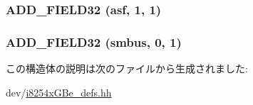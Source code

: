 \label{structiGbReg_1_1Regs_1_1MANC_a4a8a02182e3eb0c5408be4e56e873e90}
\hypertarget{structiGbReg_1_1Regs_1_1MANC_aa2498565dcb9beee017c0ced1f44f243}{
\subsubsection[{ADD\_\-FIELD32}]{\setlength{\rightskip}{0pt plus 5cm}ADD\_\-FIELD32 (asf, \/  1, \/  1)}}
\label{structiGbReg_1_1Regs_1_1MANC_aa2498565dcb9beee017c0ced1f44f243}
\hypertarget{structiGbReg_1_1Regs_1_1MANC_a749cf5baaa7a0f0df238a99d5f07bedb}{
\subsubsection[{ADD\_\-FIELD32}]{\setlength{\rightskip}{0pt plus 5cm}ADD\_\-FIELD32 (smbus, \/  0, \/  1)}}
\label{structiGbReg_1_1Regs_1_1MANC_a749cf5baaa7a0f0df238a99d5f07bedb}


この構造体の説明は次のファイルから生成されました:\begin{DoxyCompactItemize}
\item 
dev/\hyperlink{i8254xGBe__defs_8hh}{i8254xGBe\_\-defs.hh}\end{DoxyCompactItemize}
